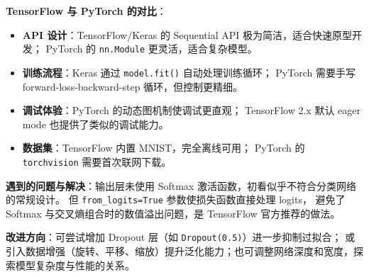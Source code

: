 \documentclass[UTF8]{ctexart}
\begin{document}
\textbf{TensorFlow 与 PyTorch 的对比}：
\begin{itemize}
  \item \textbf{API 设计}：TensorFlow/Keras 的 Sequential API 极为简洁，适合快速原型开发；
        PyTorch 的 \texttt{nn.Module} 更灵活，适合复杂模型。
  \item \textbf{训练流程}：Keras 通过 \texttt{model.fit()} 自动处理训练循环；
        PyTorch 需要手写 forward-loss-backward-step 循环，但控制更精细。
  \item \textbf{调试体验}：PyTorch 的动态图机制使调试更直观；
        TensorFlow 2.x 默认 eager mode 也提供了类似的调试能力。
  \item \textbf{数据集}：TensorFlow 内置 MNIST，完全离线可用；
        PyTorch 的 \texttt{torchvision} 需要首次联网下载。
\end{itemize}

\textbf{遇到的问题与解决}：输出层未使用 Softmax 激活函数，初看似乎不符合分类网络的常规设计。
但 \texttt{from\_logits=True} 参数使损失函数直接处理 logits，
避免了 Softmax 与交叉熵组合时的数值溢出问题，是 TensorFlow 官方推荐的做法。

\textbf{改进方向}：可尝试增加 Dropout 层（如 \texttt{Dropout(0.5)}）进一步抑制过拟合；
或引入数据增强（旋转、平移、缩放）提升泛化能力；也可调整网络深度和宽度，探索模型复杂度与性能的关系。
\end{document}
